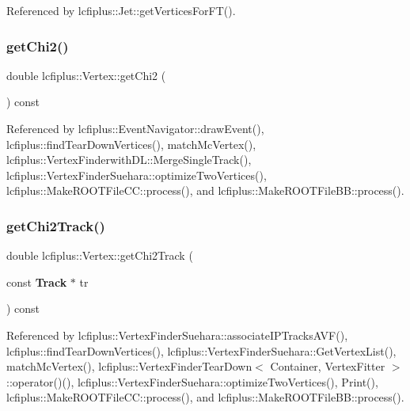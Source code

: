 Referenced by lcfiplus\+::\+Jet\+::get\+Vertices\+For\+F\+T().

\mbox{\label{classlcfiplus_1_1Vertex_a103b1f4d8f99189fb5d5d8e98ea84ffe}} 
\subsubsection{get\+Chi2()}
{\footnotesize\ttfamily double lcfiplus\+::\+Vertex\+::get\+Chi2 (\begin{DoxyParamCaption}{ }\end{DoxyParamCaption}) const\hspace{0.3cm}{\ttfamily [inline]}}



Referenced by lcfiplus\+::\+Event\+Navigator\+::draw\+Event(), lcfiplus\+::find\+Tear\+Down\+Vertices(), match\+Mc\+Vertex(), lcfiplus\+::\+Vertex\+Finderwith\+D\+L\+::\+Merge\+Single\+Track(), lcfiplus\+::\+Vertex\+Finder\+Suehara\+::optimize\+Two\+Vertices(), lcfiplus\+::\+Make\+R\+O\+O\+T\+File\+C\+C\+::process(), and lcfiplus\+::\+Make\+R\+O\+O\+T\+File\+B\+B\+::process().

\mbox{\label{classlcfiplus_1_1Vertex_ac9c8b6ff1ddaeb958d8f2a4260677c26}} 
\subsubsection{get\+Chi2\+Track()}
{\footnotesize\ttfamily double lcfiplus\+::\+Vertex\+::get\+Chi2\+Track (\begin{DoxyParamCaption}\item[{const \textbf{ Track} $\ast$}]{tr }\end{DoxyParamCaption}) const\hspace{0.3cm}{\ttfamily [inline]}}



Referenced by lcfiplus\+::\+Vertex\+Finder\+Suehara\+::associate\+I\+P\+Tracks\+A\+V\+F(), lcfiplus\+::find\+Tear\+Down\+Vertices(), lcfiplus\+::\+Vertex\+Finder\+Suehara\+::\+Get\+Vertex\+List(), match\+Mc\+Vertex(), lcfiplus\+::\+Vertex\+Finder\+Tear\+Down$<$ Container, Vertex\+Fitter $>$\+::operator()(), lcfiplus\+::\+Vertex\+Finder\+Suehara\+::optimize\+Two\+Vertices(), Print(), lcfiplus\+::\+Make\+R\+O\+O\+T\+File\+C\+C\+::process(), and lcfiplus\+::\+Make\+R\+O\+O\+T\+File\+B\+B\+::process().

